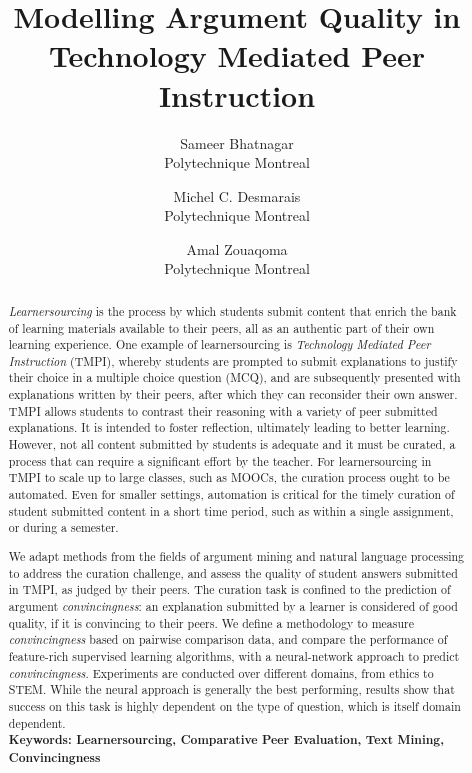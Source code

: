\documentclass[notitlepage,12pt]{jedm}
\begin{document}
	
	\title{Modelling Argument Quality in Technology Mediated Peer Instruction}
	\date{} %
	
	\author{
		{\large Sameer Bhatnagar}
		\\Polytechnique Montreal
	 	\and 
	 	{\large Michel C. Desmarais}
	 	\\Polytechnique Montreal
	 	\and 
	 	{\large Amal Zouaq}oma
 		\\Polytechnique Montreal
 }

	
	\maketitle
	
	\begin{abstract}
	\textit{Learnersourcing} is the process by which students submit content 
	that enrich the bank of learning materials available to their peers, all as 
	an 	authentic part of their own learning experience.  
	One example of learnersourcing is \textit{Technology Mediated Peer 
	Instruction} (TMPI), whereby students are prompted to submit explanations 
	to justify their choice in a multiple choice question (MCQ), and are 
	subsequently presented with explanations written by their peers, after 
	which they can reconsider their own answer.  
	TMPI allows students to contrast their reasoning with a variety of peer 
	submitted explanations. 
	It is intended to foster reflection, ultimately leading to better 
	learning.  
	However, not all content submitted by students is adequate and it must be 
	curated, a process that can require a significant effort by the teacher.  
	For learnersourcing in TMPI to scale up to large classes, such as MOOCs, 
	the curation process ought to be automated.  
	Even for smaller settings, automation is critical for the timely curation 
	of student submitted content in a short time period, such as within a 
	single assignment, or during a semester.
	
	We adapt methods from the fields of argument mining and natural language 
	processing to address the curation challenge, and assess the quality of 
	student answers submitted in TMPI, as judged by their peers.  
	The curation task is confined to the prediction of argument 
	\textit{convincingness}: an explanation submitted by a learner is 
	considered of good quality, if it is convincing to their peers.  
	We define a methodology to measure \textit{convincingness} based on 
	pairwise comparison data, and compare the performance of feature-rich 
	supervised learning algorithms, with a neural-network approach to predict 
	\textit{convincingness}.
	Experiments are conducted over different domains, from ethics to STEM.  
	While the neural approach is generally the best performing, results show 
	that success on this task is highly dependent on the type of question, 
	which is itself domain dependent.
	\\ %
		{\parindent0pt
			\textbf{Keywords: Learnersourcing, Comparative Peer Evaluation, 
			Text Mining, Convincingness} 
		}
	\end{abstract}
\end{document}
